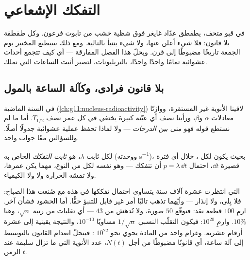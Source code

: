 \chapter{التفكك الإشعاعي}\label{ch:g12:radioactive-decay}

في قبو متحف، يطقطق عدّاد غايغر فوق شظية خشب من تابوت
فرعون. وكل طقطقة بلا قانون: فلا شيء أعلن عنها، ولا شيء
يتنبأ بالتالية. ومع ذلك سيطبع المختبر يوم الجمعة تاريخًا مضبوطًا إلى
قرن. ويحلّ هذا الفصل المفارقة --- أي كيف تتجمع أحداث عشوائية تمامًا
واحدًا واحدًا، بالتريليونات، لتصير أثبت الساعات التي نملك.

\section{بلا قانون فرادى، وكآلة الساعة بالمول}

في السنة الماضية (\cref{ch:g11:nucleus-radioactivity}) لاقينا الأنوية
غير المستقرة، ووازنّا معادلات $\alpha$ و$\beta$، ورأينا نصف أي عيّنة
كبيرة يختفي في كل عمر نصف $T_{1/2}$. أما ما لم نستطع قوله فهو
\emph{متى بين الدرجات} --- ولا لماذا تحفظ عملية عشوائية
جدولًا أصلًا. وللسؤالين معًا جواب واحد.

\begin{definition}\label{def:g12:radioactive-decay:lambda}
لكل   ثابت $\lambda$، هو \emph{ثابت
التفكك} الخاص به (ووحدته \unit{s^{-1}})، بحيث يكون لكل ، خلال أي
فترة قصيرة $\dd t$، احتمال $p = \lambda\,\dd t$ أن
تتفكك --- وهو نفسه لكل  من النوع، مهما يكن عمرها،
ولا تمسّه الحرارة ولا  ولا الكيمياء.
\end{definition}

\begin{remark}\label{rem:g12:radioactive-decay:crowds}
 التي انتظرت عشرة آلاف سنة يتساوى احتمال تفككها
في هذه  مع  صُنعت هذا الصباح: فلا بِلى، ولا إنذار --- وأيّهما
تذهب تاليًا أمر غير قابل للتنبؤ حقًّا. أما الحشود فشأن آخر. ارمِ
$100$ قطعة نقد: فتوقّع $50$ صورة، ولا تُدهش من $43$ ---
أي تقلبات من رتبة $\sqrt n$، وهنا $10\%$. وارمِ $10^{20}$: فيكون
التقلّب النسبي $1/\sqrt n$ مساويًا $10^{-10}$، والنتيجة يقينية إلى
عشرة أرقام عشرية. وغرام واحد من المادة يحوي نحو $10^{22}$ :
فينحلّ انعدام القانون بالتوسيط إلى آلة ساعة، أي قانونًا مضبوطًا من أجل $N(t)$، عدد الأنوية
التي ما تزال سليمة عند الزمن $t$.
\end{remark}

